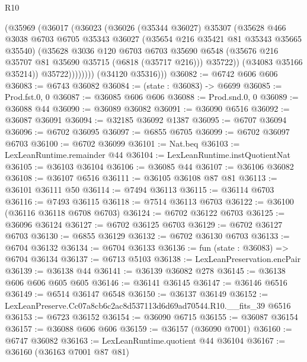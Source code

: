 \begin{lexlean}{R10}
\begin{coremodule}
                  (@35969
                    (@36017
                      (@36023
                        (@36026
                          (@35344 @36027)
                          @35307
                          (@35628
                            @466
                            @3038
                            @6703
                            @6705
                            @35343
                            @36027
                            (@35654 @216 @35421 @81 @35343 @35665 @35540)
                            (@35628
                              @3036
                              @120
                              @6703
                              @6703
                              @35690
                              @6548
                              (@35676 @216 @35707 @81 @35690 @35715 (@6818 (@35717 @216)))
                              @35722))
                          (@34083 @35166 @35214))
                        @35722))))))))
        (@34120 @35316)))
@36082 := @6742 @606 @606
@36083 := @6743 @36082
@36084 := (state : @36083) -> @6699
@36085 := Prod.fst.{0, 0}
@36087 := @36085 @606 @606
@36088 := Prod.snd.{0, 0}
@36089 := @36088 @44
@36090 := @36089 @36082
@36091 := @36090 @6516
@36092 := @36087 @36091
@36094 := @32185 @36092 @1387
@36095 := @6707 @36094
@36096 := @6702 @36095
@36097 := @6855 @6705
@36099 := @6702 @36097 @6703
@36100 := @6702 @36099
@36101 := Nat.beq
@36103 := LexLeanRuntime.remainder @44
@36104 := LexLeanRuntime.instQuotientNat
@36105 := @36103 @36104
@36106 := @36085 @44
@36107 := @36106 @36082
@36108 := @36107 @6516
@36111 := @36105 @36108 @87 @81
@36113 := @36101 @36111 @50
@36114 := @7494 @36113
@36115 := @36114 @6703
@36116 := @7493 @36115
@36118 := @7514 @36113 @6703
@36122 := @36100 (@36116 @36118 @6708 @6703)
@36124 := @6702 @36122 @6703
@36125 := @36096 @36124
@36127 := @6702 @36125 @6703
@36129 := @6702 @36127 @6703
@36130 := @6855 @36129
@36132 := @6702 @36130 @6703
@36133 := @6704 @36132
@36134 := @6704 @36133
@36136 := fun (state : @36083) => @6704 @36134
@36137 := @6713 @5103
@36138 := LexLeanPreservation.encPair
@36139 := @36138 @44
@36141 := @36139 @36082 @278
@36145 := @36138 @606 @606 @605 @605
@36146 := @36141 @36145
@36147 := @36146 @6516
@36149 := @6514 @36147 @6548
@36150 := @36137 @36149
@36152 := LexLeanPreserve.Cc07a8cb6c2ac8d537113d6d69ad70544.R10.__fits_39 @6516
@36153 := @6723 @36152
@36154 := @36090 @6715
@36155 := @36087 @36154
@36157 := @36088 @606 @606
@36159 := @36157 (@36090 @7001)
@36160 := @6747 @36082
@36163 := LexLeanRuntime.quotient @44 @36104
@36167 := @36160 (@36163 @7001 @87 @81)

\end{coremodule}
\end{lexlean}
